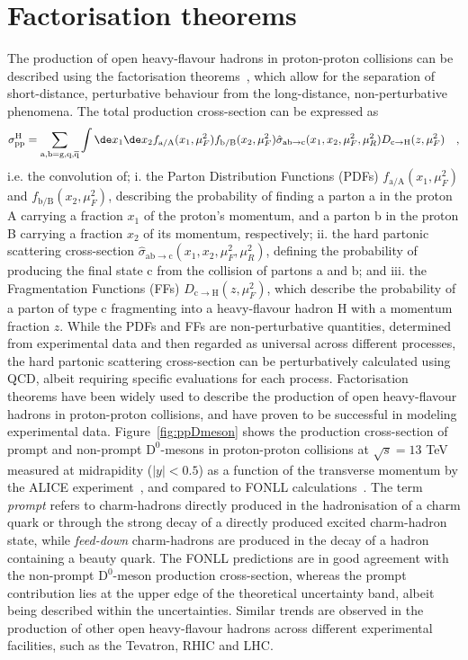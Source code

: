 \section{Factorisation theorems}
The production of open heavy-flavour hadrons in proton-proton collisions can be described using the factorisation theorems~\cite{Collins:1989gx}, which allow for the separation of short-distance, perturbative behaviour from the long-distance, non-perturbative phenomena. The total production cross-section can be expressed as
\begin{equation*}
    \sigma_{\text{pp}}^\mathrm{H} = \sum_\mathrm{a,b = g, q, \overline{q}} \int \de x_1 \de x_2 f_\mathrm{a/A}(x_1,\mu_F^2) f_\mathrm{b/B}(x_2,\mu_F^2) \hat{\sigma}_\mathrm{ab \rightarrow c} (x_1,x_2,\mu_F^2,\mu_R^2) D_\mathrm{c\rightarrow H}(z,\mu_F^2) \quad ,
\end{equation*}
i.e. the convolution of; i. the Parton Distribution Functions (PDFs) $f_\mathrm{a/A}(x_1,\mu_F^2)$ and $f_\mathrm{b/B}(x_2,\mu_F^2)$, describing the probability of finding a parton a in the proton A carrying a fraction $x_1$ of the proton's momentum, and a parton b in the proton B carrying a fraction $x_2$ of its momentum, respectively; ii. the hard partonic scattering cross-section $\hat{\sigma}_\mathrm{ab \rightarrow c} (x_1,x_2,\mu_F^2,\mu_R^2)$, defining the probability of producing the final state c from the collision of partons a and b; and iii. the Fragmentation Functions (FFs) $D_\mathrm{c\rightarrow H}(z,\mu_F^2)$, which describe the probability of a parton of type c fragmenting into a heavy-flavour hadron H with a momentum fraction $z$. While the PDFs and FFs are non-perturbative quantities, determined from experimental data and then regarded as universal across different processes, the hard partonic scattering cross-section can be perturbatively calculated using QCD, albeit requiring specific evaluations for each process. Factorisation theorems have been widely used to describe the production of open heavy-flavour hadrons in proton-proton collisions, and have proven to be successful in modeling experimental data. Figure~\ref{fig:ppDmeson} shows the production cross-section of prompt and non-prompt $\mathrm{D^0}$-mesons in proton-proton collisions at $\sqrt{s} = 13$ TeV measured at midrapidity ($\lvert y\rvert<0.5$) as a function of the transverse momentum by the ALICE experiment~\cite{ALICE:2021mgk}, and compared to FONLL calculations~\cite{Cacciari:1998it}. The term \emph{prompt} refers to charm-hadrons directly produced in the hadronisation of a charm quark or through the strong decay of a directly produced excited charm-hadron state, while \emph{feed-down} charm-hadrons are produced in the decay of a hadron containing a beauty quark. The FONLL predictions are in good agreement with the non-prompt $\mathrm{D^0}$-meson production cross-section, whereas the prompt contribution lies at the upper edge of the theoretical uncertainty band, albeit being described within the uncertainties.  Similar trends are observed in the production of other open heavy-flavour hadrons across different experimental facilities, such as the Tevatron, RHIC and LHC.

